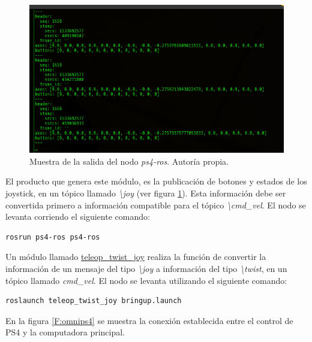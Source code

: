\begin{figure}[H]
\centering
\includegraphics[scale=0.5]{imagenes/joy.png}
\caption{Muestra de la salida del nodo \textit{ps4-ros}. Autoría propia. }
\label{F:joy}
\end{figure}

El producto que genera este módulo, es la publicación de botones y estados de los joystick, en un tópico llamado \textit{\textbackslash joy} (ver figura \ref{F:joy}). Esta información debe ser convertida primero a información compatible para el tópico \textit{\textbackslash cmd\_vel}. El nodo se levanta corriendo el siguiente comando:

\begin{lstlisting}
rosrun ps4-ros ps4-ros
\end{lstlisting}

Un módulo llamado \href{http://wiki.ros.org/teleop_twist_joy}{teleop\_twist\_joy} realiza la función de convertir la información de un mensaje del tipo \textit{\textbackslash joy} a información del tipo \textit{\textbackslash twist}, en un tópico llamado \textit{cmd\_vel}. El nodo se levanta utilizando el siguiente comando:

\begin{lstlisting}
roslaunch teleop_twist_joy bringup.launch
\end{lstlisting}

En la figura \ref{F:omnips4} se muestra la conexión establecida entre el control de PS4 y la computadora principal.

